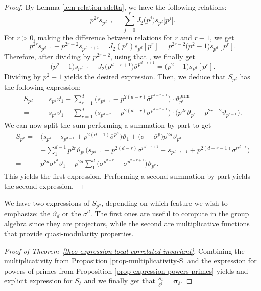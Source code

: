 \documentclass[pdftex]{sigma}
\numberwithin{equation}{section}
\theoremstyle{definition}
\begin{document}
\begin{proof}
 By Lemma \ref{lem-relation-sdelta}, we have the following relations:
 \[ p^{2r}s_{p^{d-r}} = \sum_{j=0}^{r} J_2\bigl(p^j\bigr) s_{p^d}\big[p^j\big]. \]
 For $r>0$, making the difference between relations for $r$ and $r-1$, we get
 \[ p^{2r}s_{p^{d-r}}-p^{2r-2}s_{p^{d-r+1}} = J_2(p^r)s_{p^d}[p^r] = p^{2r-2}\bigl(p^2-1\bigr)s_{p^d}[p^r]. \]
 Therefore, after dividing by $p^{2r-2}$, using that , we finally get
 \[ \bigl(p^2-1\bigr)s_{p^{d-r}} -J_2\bigl(p^{d-r+1}\bigr)\overline{\sigma}^{p^{d-r+1}} = \bigl(p^2-1\bigr)s_{p^d}[p^r]. \]
 Dividing by $p^2-1$ yields the desired expression. Then, we deduce that $S_{p^d}$ has the following expression:
 \begin{align*}
 S_{p^d} ={} & s_{p^d}\vartheta_1 + \sum_{r=1}^d \bigl(s_{p^{d-r}}-p^{2(d-r)}\overline{\sigma}^{p^{d-r+1}} \bigr)\cdot \vartheta_{p^r}^\mathrm{prim} \\
 ={} & s_{p^d}\vartheta_1 + \sum_{r=1}^d \bigl(s_{p^{d-r}}-p^{2(d-r)}\overline{\sigma}^{p^{d-r+1}} \bigr)\cdot \bigl(p^{2r}\vartheta_{p^r}-p^{2r-2}\vartheta_{p^{r-1}} \bigr).
 \end{align*}
 We can now split the sum performing a summation by part to get
 \begin{align*}
 S_{p^d}= {}& \bigl(s_{p^d}-s_{p^{d-1}}+p^{2(d-1)}\overline{\sigma}^{p^d}\bigr)\vartheta_1 +\bigl(\sigma-\overline{\sigma}^p\bigr)p^{2d}\vartheta_{p^d} \\
 & + \sum_1^{d-1} p^{2r}\vartheta_{p^r} \bigl(s_{p^{d-r}} -p^{2(d-r)}\overline{\sigma}^{p^{d-r+1}}-s_{p^{d-r-1}}+p^{2(d-r-1)}\overline{\sigma}^{p^{d-r}} \bigr) \\
 ={} & p^{2d}\overline{\sigma}^{p^d}\vartheta_1 +p^{2d}\sum_1^d \bigl(\overline{\sigma}^{p^{d-r}} - \overline{\sigma}^{p^{d-r+1}} \bigr)\vartheta_{p^r}.
 \end{align*}
 This yields the first expression. Performing a second summation by part yields the second expression.
\end{proof}

We have two expressions of $S_{p^d}$, depending on which feature we wish to emphasize: the $\vartheta_d$ or the $\overline{\sigma}^d$. The first ones are useful to compute in the group algebra since they are projectors, while the second are multiplicative functions that provide quasi-modularity properties.

\begin{proof}[Proof of Theorem~\ref{theo-expression-local-correlated-invariant}]
Combining the multiplicativity from Proposition \ref{prop-multiplicativity-S} and the expression for powers of primes from Proposition \ref{prop-expression-powers-primes} yields and explicit expression for $S_\delta$ and we finally get that $\frac{S_\delta}{\delta^2}=\boldsymbol{\sigma}_\delta$.
\end{proof}
\end{document}

